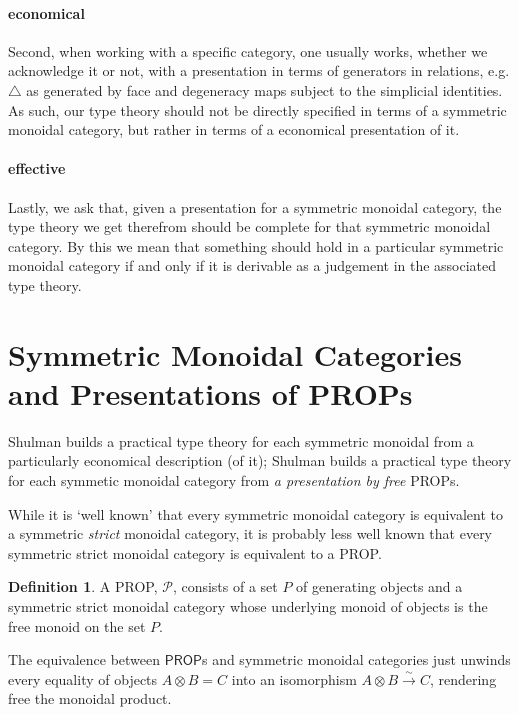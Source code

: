 \documentclass[pra,floatfix,
amsmath,superscriptaddress, 12pt]{article}
\theoremstyle{definition}
\newtheorem{definition}{Definition}
\newcommand{\mc}[1]{\mathcal{#1}}
\begin{document}
\paragraph{economical} Second, when working with a specific category, one usually works, whether we acknowledge it or not, with a presentation in terms of generators in relations, e.g. $\bigtriangleup$ as generated by face and degeneracy maps subject to the simplicial identities. As such, our type theory should not be directly specified in terms of a symmetric monoidal category, but rather in terms of a economical presentation of it. 

\paragraph{effective} Lastly, we ask that, given a presentation for a symmetric monoidal category, the type theory we get therefrom should be complete for that symmetric monoidal category. By this we mean that something should hold in a particular symmetric monoidal category if and only if it is derivable as a judgement in the associated type theory.

\section{Symmetric Monoidal Categories and Presentations of \textsf{PROP}s}

Shulman builds a practical type theory for each symmetric monoidal from a particularly economical description (of it); Shulman builds a practical type theory for each symmetic monoidal category from \emph{a presentation by free} \textsf{PROP}s.

While it is `well known' that every symmetric monoidal category is equivalent
to a symmetric \emph{strict} monoidal category, it is probably less well known
that every symmetric strict monoidal category is equivalent to
a PROP.

\begin{definition} A PROP, $\mc{P}$, consists of a set $P$ of generating objects and a symmetric strict monoidal category whose underlying monoid of objects is the free monoid on the set $P$.
\end{definition}

The equivalence between $\mathsf{PROP}$s and symmetric monoidal categories just unwinds every equality of objects $A\otimes B = C$ into an isomorphism $A \otimes B \overset{\sim}{\longrightarrow} C$, rendering free the monoidal product.
\end{document}
